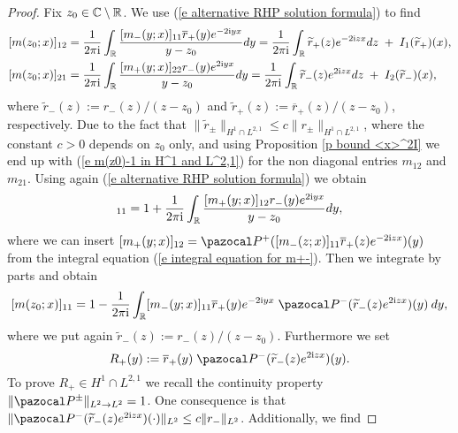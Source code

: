 \begin{proof}
    Fix $z_0\in\mathbb C\setminus\mathbb R$. We use (\ref{e alternative RHP solution formula}) to find
    \begin{equation}\label{e m21 m12 in L^2,1}
        \begin{aligned}
            &[m(z_0;x)]_{12}= \frac{1}{2\pi\mathrm{i}} \int_{\mathbb R}\frac{[m_-(y;x)]_{11}\overline{r}_+(y) e^{-2\mathrm{i} yx}}{y-z_0}dy= \frac{1}{2\pi\mathrm{i}}\int_{\mathbb R}\widetilde{r}_+(z) e^{-2\mathrm{i} zx}dz\;+\;I_1(\widetilde{r}_+)(x),\\
            &[m(z_0;x)]_{21}= \frac{1}{2\pi\mathrm{i}} \int_{\mathbb R}\frac{[m_+(y;x)]_{22}r_-(y) e^{2\mathrm{i} yx}}{y-z_0}dy= \frac{1}{2\pi\mathrm{i}}\int_{\mathbb R}\widetilde{r}_-(z) e^{2\mathrm{i} zx}dz\;+\;I_2(\widetilde{r}_-)(x),
        \end{aligned}
    \end{equation}
    where $\widetilde{r}_-(z):={r}_-(z)/(z-z_0)$ and $\widetilde{r}_+(z):=\overline{r}_+(z)/(z-z_0)$, respectively. Due to the fact that $\|\widetilde{r}_{\pm}\|_{H^1\cap L^{2,1}}\leq c \|{r}_{\pm}\|_{H^1\cap L^{2,1}}$, where the constant $c>0$ depends on $z_0$ only, and using Proposition \ref{p bound <x>^2I} we end up with (\ref{e m(z0)-1 in H^1 and L^2,1}) for the non diagonal entries $m_{12}$ and $m_{21}$.
    Using again (\ref{e alternative RHP solution formula}) we obtain
    \begin{equation*}
        [m(z_0;x)]_{11}=1+\frac{1}{2\pi\ii} \int_{\Real} \frac{[m_+(y;x)]_{12}r_-(y) e^{2\ii yx}}{y-z_0}dy,
    \end{equation*}
    where we can insert $[m_+(y;x)]_{12}=\Pp ([m_-(z;x)]_{11} \overline{r}_+(z) e^{-2\ii zx})(y)$ from the integral equation (\ref{e integral equation for m+-}). Then we integrate by parts and obtain
    \begin{equation}\label{e formula for m(z_0;x)-1 in the proof of the lemma}
        [m(z_0;x)]_{11}=1-\frac{1}{2\pi\ii} \int_{\Real} [m_-(y;x)]_{11} \overline{r}_+(y) e^{-2\ii yx}\;\Pm (\widetilde{r}_-(z) e^{2\ii zx})(y)\:dy,
    \end{equation}
    where we put again $\widetilde{r}_-(z):={r}_-(z)/(z-z_0)$. Furthermore we set
    \begin{equation*}
        R_+(y):=\overline{r}_+(y)\;\Pm (\widetilde{r}_-(z) e^{2\ii zx})(y).
    \end{equation*}
    To prove $R_+\in H^1\cap L^{2,1}$ we recall the continuity property $\|\Ppm\|_{L^2\to L^2}=1$. One consequence is that $\|\Pm (\widetilde{r}_-(z) e^{2\ii zx})(\cdot)\|_{L^2} \leq c \|r_-\|_{L^2}$. Additionally, we find

\end{proof}
